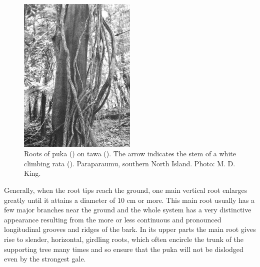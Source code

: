 \begin{figure}
	\includegraphics[width=0.5\textwidth]{graphics/figure47puka-roots.jpg}
	\centering
	\caption[Roots of puka on tawa]{Roots of puka () on tawa ().
    The arrow indicates the stem of a white climbing rata ().
    Paraparaumu, southern North Island.
	Photo: M. D. King.}
	\label{fig:47puka-roots}
\end{figure}

Generally, when the root tips reach the ground, one main vertical root enlarges greatly until it attains a diameter of 10 cm or more.
This main root usually has a few major branches near the ground and the whole system has a very distinctive appearance resulting from the more or less continuous and pronounced longitudinal grooves and ridges of the bark.
In its upper parts the main root gives rise to slender, horizontal, girdling roots, which often encircle the trunk of the supporting tree many times and so ensure that the puka will not be dislodged even by the strongest gale.

